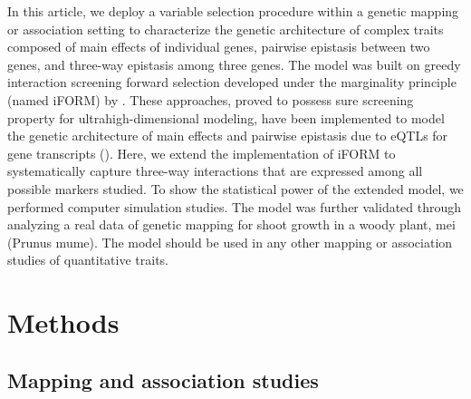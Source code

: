 \documentclass[11pt,]{book}
\theoremstyle{definition}
\theoremstyle{definition}
\theoremstyle{remark}
\begin{document}
In this article, we deploy a variable selection procedure within a
genetic mapping or association setting to characterize the genetic
architecture of complex traits composed of main effects of individual
genes, pairwise epistasis between two genes, and three-way epistasis
among three genes. The model was built on greedy interaction screening
forward selection developed under the marginality principle (named
iFORM) by \cite{hao2014interaction}. These approaches, proved to possess
sure screening property for ultrahigh-dimensional modeling, have been
implemented to model the genetic architecture of main effects and
pairwise epistasis due to eQTLs for gene transcripts
(\cite{gosik2016iform}). Here, we extend the implementation of iFORM to
systematically capture three-way interactions that are expressed among
all possible markers studied. To show the statistical power of the
extended model, we performed computer simulation studies. The model was
further validated through analyzing a real data of genetic mapping for
shoot growth in a woody plant, mei (Prunus mume). The model should be
used in any other mapping or association studies of quantitative traits.

\section{Methods}\label{methods-1}

\subsection{Mapping and association
studies}\label{mapping-and-association-studies}
\end{document}
